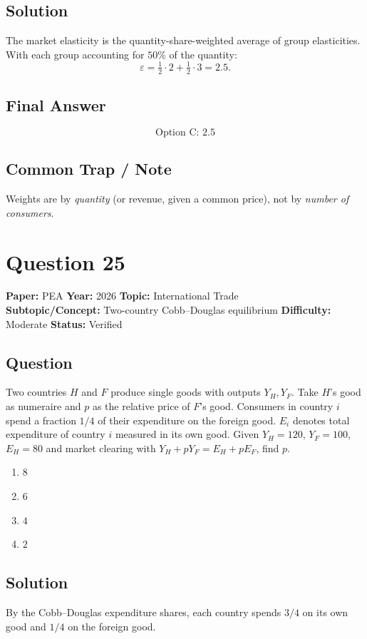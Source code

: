 \documentclass[11pt]{article}
\begin{document}
\subsection*{Solution}
The market elasticity is the quantity-share-weighted average of group elasticities. With each group accounting for $50\%$ of the quantity:
\[
\varepsilon = \tfrac{1}{2}\cdot 2 + \tfrac{1}{2}\cdot 3 = 2.5.
\]

\subsection*{Final Answer}
\[
\boxed{\text{Option C: } 2.5}
\]

\subsection*{Common Trap / Note}
Weights are by \emph{quantity} (or revenue, given a common price), not by \emph{number of consumers}.

\section*{Question 25}
\textbf{Paper:} PEA \quad \textbf{Year:} 2026 \quad \textbf{Topic:} International Trade \\
\textbf{Subtopic/Concept:} Two-country Cobb--Douglas equilibrium \quad
\textbf{Difficulty:} Moderate \quad \textbf{Status:} Verified

\subsection*{Question}
Two countries $H$ and $F$ produce single goods with outputs $Y_H, Y_F$. Take
$H$'s good as numeraire and $p$ as the relative price of $F$'s good. Consumers
in country $i$ spend a fraction $1/4$ of their expenditure on the foreign good.
$E_i$ denotes total expenditure of country $i$ measured in its own good.
Given $Y_H = 120$, $Y_F = 100$, $E_H = 80$ and market clearing with
$Y_H + p Y_F = E_H + p E_F$, find $p$.
\begin{enumerate}[label=(\Alph*)]
\item $8$ \item $6$ \item $4$ \item $2$
\end{enumerate}

\subsection*{Solution}
By the Cobb--Douglas expenditure shares, each country spends $3/4$ on its own good and $1/4$ on the foreign good.
\end{document}
